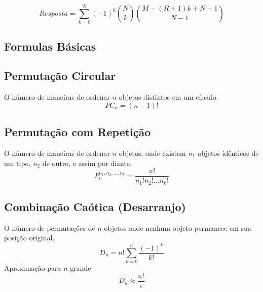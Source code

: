 $$ Resposta = \sum^{N}_{k=0} (-1)^k \binom{N}{k} \binom{M - (R + 1) k + N - 1}{N-1} $$

\subsection{Formulas Básicas}

\subsection*{Permutação Circular}
O número de maneiras de ordenar $n$ objetos distintos em um círculo.
$$ PC_n = (n-1)! $$

\subsection*{Permutação com Repetição}
O número de maneiras de ordenar $n$ objetos, onde existem $n_1$ objetos idênticos de um tipo, $n_2$ de outro, e assim por diante.
$$ P_n^{n_1, n_2, \dots, n_k} = \frac{n!}{n_1! n_2! \dots n_k!} $$

\subsection*{Combinação Caótica (Desarranjo)}
O número de permutações de $n$ objetos onde nenhum objeto permanece em sua posição original.
$$ D_n = n! \sum_{k=0}^{n} \frac{(-1)^k}{k!} $$
Aproximação para $n$ grande:
$$ D_n \approx \frac{n!}{e} $$
